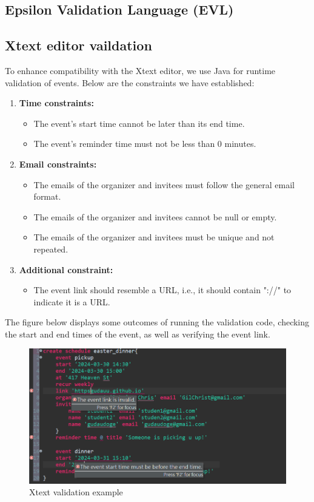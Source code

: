 \documentclass[12pt, letterpaper, twoside]{article}
\begin{document}
\subsection{Epsilon Validation Language (EVL)}
\subsection{Xtext editor vaildation}
To enhance compatibility with the Xtext editor, we use Java for runtime validation of events. Below are the constraints we have established:
\begin{enumerate}
    \item \textbf{Time constraints:}
    \begin{itemize}
        \item The event's start time cannot be later than its end time.
        \item The event's reminder time must not be less than 0 minutes.
    \end{itemize}

    \item \textbf{Email constraints:}
    \begin{itemize}
        \item The emails of the organizer and invitees must follow the general email format.
        \item The emails of the organizer and invitees cannot be null or empty.
        \item The emails of the organizer and invitees must be unique and not repeated.
    \end{itemize}

    \item \textbf{Additional constraint:}
    \begin{itemize}
        \item The event link should resemble a URL, i.e., it should contain "://" to indicate it is a URL.
    \end{itemize}
\end{enumerate}

The figure below displays some outcomes of running the validation code, checking the start and end times of the event, as well as verifying the event link.
\begin{figure}
    \centering
    \includegraphics[width=1\linewidth]{xtext validation.png}
    \caption{Xtext validation example}
    \label{fig:enter-label}
\end{figure}
\newpage
\end{document}
